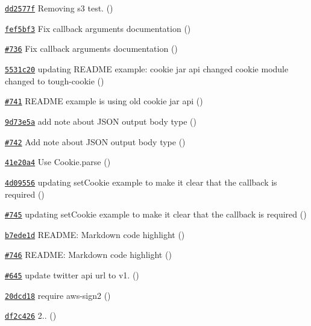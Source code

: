 \begin{DoxyItemize}
\item \href{https://github.com/mikeal/request/commit/dd2577f8264d4d4b07484dec7094b72c00c8416f}{\tt dd2577f} Removing s3 test. ()
\item \href{https://github.com/mikeal/request/commit/fef5bf34258e3695b61c048c683f1d4a7f99b368}{\tt fef5bf3} Fix callback arguments documentation ()
\item \href{https://github.com/mikeal/request/pull/736}{\tt \#736} Fix callback arguments documentation ()
\item \href{https://github.com/mikeal/request/commit/5531c208678145ef35b06e948190be2fd6a8a1c8}{\tt 5531c20} updating R\+E\+A\+D\+M\+E example\+: cookie jar api changed cookie module changed to tough-\/cookie ()
\item \href{https://github.com/mikeal/request/pull/741}{\tt \#741} R\+E\+A\+D\+M\+E example is using old cookie jar api ()
\item \href{https://github.com/mikeal/request/commit/9d73e5a277af141a6e4fa9dbcae5d0c3b755d277}{\tt 9d73e5a} add note about J\+S\+O\+N output body type ()
\item \href{https://github.com/mikeal/request/pull/742}{\tt \#742} Add note about J\+S\+O\+N output body type ()
\item \href{https://github.com/mikeal/request/commit/41e20a4d288e30101e493b383a0e4852a3271a98}{\tt 41e20a4} Use Cookie.\+parse ()
\item \href{https://github.com/mikeal/request/commit/4d095562a5c42ffb41b0ff194e9e6f32c0f44372}{\tt 4d09556} updating set\+Cookie example to make it clear that the callback is required ()
\item \href{https://github.com/mikeal/request/pull/745}{\tt \#745} updating set\+Cookie example to make it clear that the callback is required ()
\item \href{https://github.com/mikeal/request/commit/b7ede1d56f9a2764e4bf764687b81419df817e5a}{\tt b7ede1d} R\+E\+A\+D\+M\+E\+: Markdown code highlight ()
\item \href{https://github.com/mikeal/request/pull/746}{\tt \#746} R\+E\+A\+D\+M\+E\+: Markdown code highlight ()
\item \href{https://github.com/mikeal/request/pull/645}{\tt \#645} update twitter api url to v1. ()
\item \href{https://github.com/mikeal/request/commit/20dcd18ce8e3397ba7e0213da9c760b048ca5b49}{\tt 20dcd18} require aws-\/sign2 ()
\item \href{https://github.com/mikeal/request/commit/df2c4264321c3db1387ddf9a945d63b9ae7d57b8}{\tt df2c426} 2.. ()
\end{DoxyItemize}


